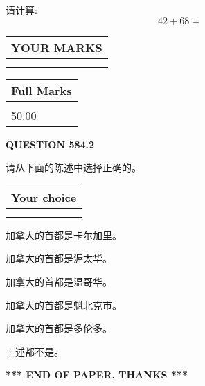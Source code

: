 \documentclass{ctexart}
\begin{document}
  
 
请计算:
\begin{equation}
42 +  %
68 = \nonumber
\end{equation}
 

 

 
  
\vspace{0.2in}
  
\noindent\begin{tabular}{|l|}
\hline
 YOUR MARKS  \\
\hline
 \\ 
 \\ 
\hline
\end{tabular}
\hspace{0.05in} \begin{tabular}{|l|}
\hline
 Full Marks  \\
\hline
 \\ 
50.00 \\
\hline
\end{tabular}
{\textbf{\Large{QUESTION
584.2 
}}}
  
  
请从下面的陈述中选择正确的。
  
  
\noindent\hspace{3.0in} \begin{tabular}{|l|}
\hline
Your choice \\
\hline
 \\ 
 \\ 
\hline
\end{tabular}
  
  
 
 
加拿大的首都是卡尔加里。
 
 
加拿大的首都是渥太华。
 
 
加拿大的首都是温哥华。
 
 
加拿大的首都是魁北克市。
 
 
加拿大的首都是多伦多。
 
 
 上述都不是。
 
 
   
   
 \vspace{0.2in}
 
   
   
   
   
\vspace{1.0in} 
{\textbf{\large{ *** END OF PAPER, THANKS *** }}} 
   
\end{document}
